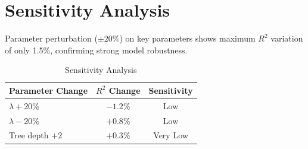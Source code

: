 \section{Sensitivity Analysis}

Parameter perturbation ($\pm 20\%$) on key parameters shows maximum $R^2$
variation of only 1.5\%, confirming strong model robustness.

\begin{table}[htbp]
  \centering
  \caption{Sensitivity Analysis}
  \begin{tabular}{lcc}
    \toprule
    \textbf{Parameter Change} & \textbf{$R^2$ Change} & \textbf{Sensitivity} \\
    \midrule
    $\lambda + 20\%$ & $-1.2\%$ & Low \\
    $\lambda - 20\%$ & $+0.8\%$ & Low \\
    Tree depth $+2$  & $+0.3\%$ & Very Low \\
    \bottomrule
  \end{tabular}
\end{table}
